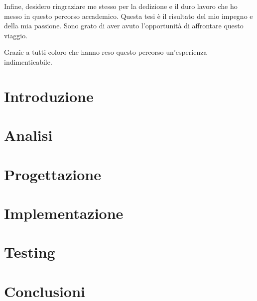 \medskip

Infine, desidero ringraziare me stesso per la dedizione e il duro lavoro che ho messo in questo percorso accademico. Questa tesi è il risultato del mio impegno e della mia passione. Sono grato di aver avuto l'opportunità di affrontare questo viaggio.

\medskip

Grazie a tutti coloro che hanno reso questo percorso un'esperienza indimenticabile.

\afterpreface
% 
% 
\chapter{Introduzione}
\label{cap1}
%
%


\chapter{Analisi}
\label{cap2}



\chapter{Progettazione}
\label{cap3}



\chapter{Implementazione}
\label{cap4}



\chapter{Testing}
\label{cap5}



\chapter{Conclusioni}
\label{cap6}



